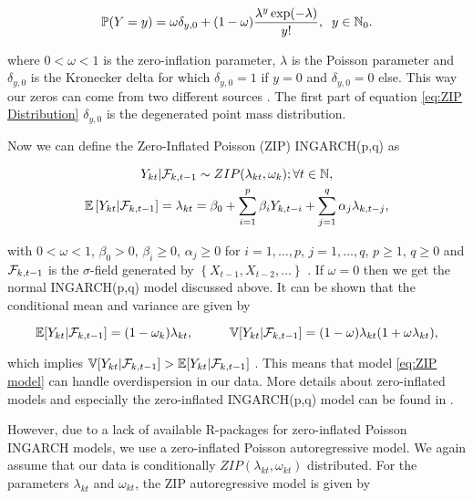 \begin{equation}
\mathbb{P}(Y=y) = \omega \delta_{y,0}+ (1-\omega) \frac{\lambda^y \exp(-\lambda)}{y!}, \hspace{0.2cm} y \in \mathbb{N}_0.
\label{eq:ZIP Distribution}
\end{equation}

where $0 < \omega < 1$ is the zero-inflation parameter, $\lambda$ is the Poisson parameter and $\delta_{y,0}$ is the Kronecker delta for which $\delta_{y,0}=1$ if $y=0$ and $\delta_{y,0}=0$ else. This way our zeros can come from two different sources \cite{Zhu:2012}. The first part of equation \ref{eq:ZIP Distribution} $\delta_{y,0}$ is the degenerated point mass distribution.

Now we can define the Zero-Inflated Poisson (ZIP) INGARCH(p,q) as

\begin{equation}
\begin{gathered}
\label{eq:ZIP model}
Y_{kt} | \mathcal{F}_{k,t-1} \sim ZIP(\lambda_{kt},\omega_k); \forall t \in \mathbb{N}, \\
\mathbb{E}\left[Y_{kt} | \mathcal{F}_{k,t-1} \right] = \lambda_{kt} = \beta_0 + \sum_{i=1}^p\beta_i Y_{k,t-i} + \sum_{j=1}^q\alpha_j \lambda_{k,t-j},
\end{gathered}
\end{equation}

with $0<\omega<1$, $\beta_0>0$, $\beta_i\geq 0$, $\alpha_j \geq 0$ for $i=1,\ldots,p$, $j=1,\ldots,q$, $p\geq 1$, $q\geq 0$ and $\mathcal{F}_{k,t-1}$ is the $\sigma$-field generated by $\left\{X_{t-1},X_{t-2},\ldots\right\}$ \cite{Zhu:2012}. If $\omega =0$ then we get the normal INGARCH(p,q) model discussed above. It can be shown that the conditional mean and variance are given by

\begin{equation}
\mathbb{E}[Y_{kt} | \mathcal{F}_{k,t-1}] = (1-\omega_k)\lambda_{kt}, \hspace{1cm} \mathbb{V}[Y_{kt} | \mathcal{F}_{k,t-1}] =(1-\omega)\lambda_{kt}(1+\omega \lambda_{kt}),
\label{eq:Conditional Mean and Variance ZIP}
\end{equation}

which implies $ \mathbb{V}[Y_{kt} | \mathcal{F}_{k,t-1}] > \mathbb{E}[Y_{kt} | \mathcal{F}_{k,t-1}]$ \cite{Zhu:2012}. This means that model \ref{eq:ZIP model} can handle overdispersion in our data. More details about zero-inflated models and especially the zero-inflated INGARCH(p,q) model can be found in \cite{Zhu:2012}.

However, due to a lack of available R-packages for zero-inflated Poisson INGARCH models, we use a zero-inflated Poisson autoregressive model. We again assume that our data is conditionally $ZIP(\lambda_{kt},\omega_{kt})$ distributed. For the parameters $\lambda_{kt}$ and $\omega_{kt}$, the ZIP autoregressive model is given by \cite{Lambert:1992}


